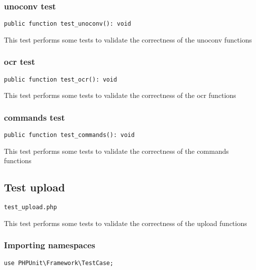 \documentclass[a4paper]{article}
\begin{document}
\hypertarget{toc361}{}
\subsubsection{unoconv test}

\begin{lstlisting}
public function test_unoconv(): void
\end{lstlisting}

This test performs some tests to validate the correctness
of the unoconv functions

\hypertarget{toc362}{}
\subsubsection{ocr test}

\begin{lstlisting}
public function test_ocr(): void
\end{lstlisting}

This test performs some tests to validate the correctness
of the ocr functions

\hypertarget{toc363}{}
\subsubsection{commands test}

\begin{lstlisting}
public function test_commands(): void
\end{lstlisting}

This test performs some tests to validate the correctness
of the commands functions

\hypertarget{toc364}{}
\subsection{Test upload}

\begin{lstlisting}
test_upload.php
\end{lstlisting}

This test performs some tests to validate the correctness
of the upload functions

\hypertarget{toc365}{}
\subsubsection{Importing namespaces}

\begin{lstlisting}
use PHPUnit\Framework\TestCase;
\end{lstlisting}
\end{document}
